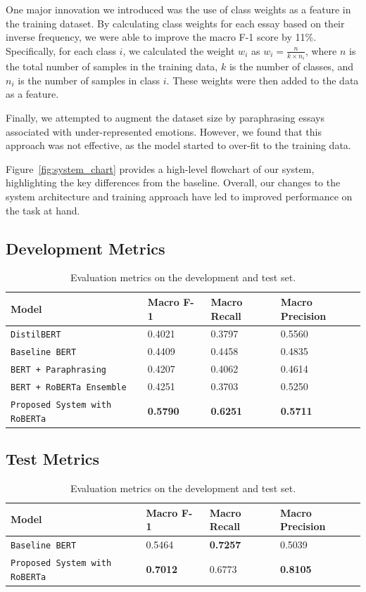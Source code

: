\documentclass[11pt]{article}
\begin{document}
One major innovation we introduced was the use of class weights as a feature in the training dataset. By calculating class weights for each essay based on their inverse frequency, we were able to improve the macro F-1 score by 11\%. Specifically, for each class $i$, we calculated the weight $w_i$ as $w_{i} = \frac{n}{k \times n_{i}}$, where $n$ is the total number of samples in the training data, $k$ is the number of classes, and $n_{i}$ is the number of samples in class $i$. These weights were then added to the data as a feature.

Finally, we attempted to augment the dataset size by paraphrasing essays associated with under-represented emotions. However, we found that this approach was not effective, as the model started to over-fit to the training data.

Figure~\ref{fig:system_chart} provides a high-level flowchart of our system, highlighting the key differences from the baseline. Overall, our changes to the system architecture and training approach have led to improved performance on the task at hand.

\begin{table}
\centering
\subsection*{Development Metrics}
\begin{tabular}{llll}
\hline
\textbf{Model} & \textbf{Macro F-1}\ & \textbf{Macro Recall} & \textbf{Macro Precision}\\
\hline
\verb|DistilBERT| & 0.4021 & 0.3797 & 0.5560 \\
\verb|Baseline BERT| & 0.4409 & 0.4458 & 0.4835 \\
\verb|BERT + Paraphrasing| & 0.4207 & 0.4062 & 0.4614 \\
\verb|BERT + RoBERTa Ensemble| & 0.4251 & 0.3703 & 0.5250 \\
\verb|Proposed System with RoBERTa| & \textbf{0.5790} & \textbf{0.6251} &\textbf{0.5711} \\
\hline
\end{tabular}
\subsection*{Test Metrics}
\begin{tabular}{llll}
\hline
\textbf{Model} & \textbf{Macro F-1}\ & \textbf{Macro Recall} & \textbf{Macro Precision}\\
\hline
\verb|Baseline BERT| & 0.5464 & \textbf{0.7257} & 0.5039 \\
\verb|Proposed System with RoBERTa| &\textbf{0.7012} & 0.6773 & \textbf{0.8105} \\
\hline
\end{tabular}
\caption{Evaluation metrics on the development and test set.}
\label{tab:dev_test_metrics_macro}
\end{table}
\end{document}

